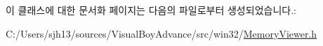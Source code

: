이 클래스에 대한 문서화 페이지는 다음의 파일로부터 생성되었습니다.\+:\begin{DoxyCompactItemize}
\item 
C\+:/\+Users/sjh13/sources/\+Visual\+Boy\+Advance/src/win32/\mbox{\hyperlink{_memory_viewer_8h}{Memory\+Viewer.\+h}}\end{DoxyCompactItemize}
